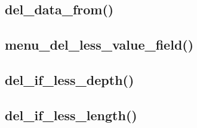 \documentclass[12pt, a4paper]{article}
\begin{document}

\subsection{del\_data\_from()}






\subsection{menu\_del\_less\_value\_field()}






\subsection{del\_if\_less\_depth()}






\subsection{del\_if\_less\_length()}




\end{document}
